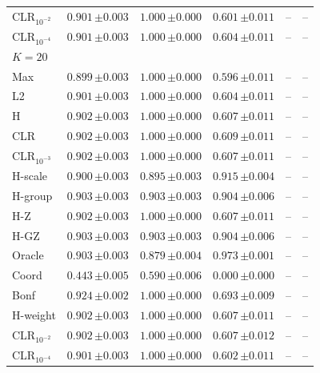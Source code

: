 \begin{tabular}{lccccc}
CLR$_{10^{-2}}$ & $0.901\,{\scriptstyle\pm 0.003}$ & $1.000\,{\scriptstyle\pm 0.000}$ & $0.601\,{\scriptstyle\pm 0.011}$ & -- & -- \\
CLR$_{10^{-4}}$ & $0.901\,{\scriptstyle\pm 0.003}$ & $1.000\,{\scriptstyle\pm 0.000}$ & $0.604\,{\scriptstyle\pm 0.011}$ & -- & -- \\
\midrule
\multicolumn{6}{l}{$K=20$} \\
Max & $0.899\,{\scriptstyle\pm 0.003}$ & $1.000\,{\scriptstyle\pm 0.000}$ & $0.596\,{\scriptstyle\pm 0.011}$ & -- & -- \\
L2 & $0.901\,{\scriptstyle\pm 0.003}$ & $1.000\,{\scriptstyle\pm 0.000}$ & $0.604\,{\scriptstyle\pm 0.011}$ & -- & -- \\
H & $0.902\,{\scriptstyle\pm 0.003}$ & $1.000\,{\scriptstyle\pm 0.000}$ & $0.607\,{\scriptstyle\pm 0.011}$ & -- & -- \\
CLR & $0.902\,{\scriptstyle\pm 0.003}$ & $1.000\,{\scriptstyle\pm 0.000}$ & $0.609\,{\scriptstyle\pm 0.011}$ & -- & -- \\
CLR$_{10^{-3}}$ & $0.902\,{\scriptstyle\pm 0.003}$ & $1.000\,{\scriptstyle\pm 0.000}$ & $0.607\,{\scriptstyle\pm 0.011}$ & -- & -- \\
H-scale & $0.900\,{\scriptstyle\pm 0.003}$ & $0.895\,{\scriptstyle\pm 0.003}$ & $0.915\,{\scriptstyle\pm 0.004}$ & -- & -- \\
H-group & $0.903\,{\scriptstyle\pm 0.003}$ & $0.903\,{\scriptstyle\pm 0.003}$ & $0.904\,{\scriptstyle\pm 0.006}$ & -- & -- \\
H-Z & $0.902\,{\scriptstyle\pm 0.003}$ & $1.000\,{\scriptstyle\pm 0.000}$ & $0.607\,{\scriptstyle\pm 0.011}$ & -- & -- \\
H-GZ & $0.903\,{\scriptstyle\pm 0.003}$ & $0.903\,{\scriptstyle\pm 0.003}$ & $0.904\,{\scriptstyle\pm 0.006}$ & -- & -- \\
Oracle & $0.903\,{\scriptstyle\pm 0.003}$ & $0.879\,{\scriptstyle\pm 0.004}$ & $0.973\,{\scriptstyle\pm 0.001}$ & -- & -- \\
Coord & $0.443\,{\scriptstyle\pm 0.005}$ & $0.590\,{\scriptstyle\pm 0.006}$ & $0.000\,{\scriptstyle\pm 0.000}$ & -- & -- \\
Bonf & $0.924\,{\scriptstyle\pm 0.002}$ & $1.000\,{\scriptstyle\pm 0.000}$ & $0.693\,{\scriptstyle\pm 0.009}$ & -- & -- \\
H-weight & $0.902\,{\scriptstyle\pm 0.003}$ & $1.000\,{\scriptstyle\pm 0.000}$ & $0.607\,{\scriptstyle\pm 0.011}$ & -- & -- \\
CLR$_{10^{-2}}$ & $0.902\,{\scriptstyle\pm 0.003}$ & $1.000\,{\scriptstyle\pm 0.000}$ & $0.607\,{\scriptstyle\pm 0.012}$ & -- & -- \\
CLR$_{10^{-4}}$ & $0.901\,{\scriptstyle\pm 0.003}$ & $1.000\,{\scriptstyle\pm 0.000}$ & $0.602\,{\scriptstyle\pm 0.011}$ & -- & -- \\
\bottomrule
\end{tabular}
